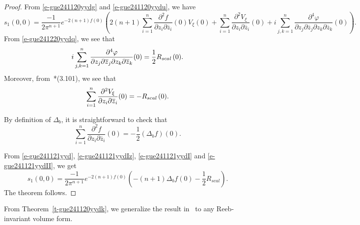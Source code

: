 \documentclass[12pt]{amsart}
\theoremstyle{definition}
\theoremstyle{named}
\numberwithin{equation}{subsection}
\begin{document}
\begin{proof}
    
    From \eqref{e-gue241120yydg} and \eqref{e-gue241120yydu}, we have 
   \begin{equation}\label{e-gue241121yyd}
       s_1(0,0)=\frac{-1}{2\pi^{n+1}}e^{-2(n+1)f(0)}\left(2(n+1)\sum_{i=1}^{n}\frac{\partial^2 f}{\partial z_i\partial\overline{z}_i}(0)V_{\xi}(0)+\sum_{i=1}^{n}\frac{\partial^2 V_\xi}{\partial z_i\partial\overline{z}_i}(0)+i\sum_{j,k=1}^n\frac{\partial^4\varphi}{\partial z_j\partial\overline{z}_j\partial z_k\partial\overline{z}_k}(0)\right).
       \end{equation}
       From \eqref{e-gue241220yydq}, we see that 
       \begin{equation}\label{e-gue241121yydIz}
i\sum_{j,k=1}^n\frac{\partial^4\varphi}{\partial z_j\partial\overline{z}_j\partial z_k\partial\overline{z}_k}(0)=\frac{1}{2}R_{{\rm scal\,}}(0).
       \end{equation}
Moreover, from~\cite{Hsiao_Shen_2nd_coefficient_BS_2020}*{(3.101)}, we see that 
 \begin{equation}\label{e-gue241121yydI}
 \sum_{i=1}^{n}\frac{\partial^2 V_\xi}{\partial z_i\partial\overline{z}_i}(0)=-R_{{\rm scal\,}}(0).
       \end{equation}

By definition of $\Delta_b$, it is straightforward to check that 
 \begin{equation}\label{e-gue241121yydII}
 \sum_{i=1}^{n}\frac{\partial^2 f}{\partial z_i\partial\overline{z}_i}(0)=-\frac{1}{2}(\Delta_bf)(0).
 \end{equation}

From \eqref{e-gue241121yyd}, \eqref{e-gue241121yydIz}, \eqref{e-gue241121yydI} and \eqref{e-gue241121yydII}, we get 
\begin{equation}\label{e-gue241121yydIII}
       s_1(0,0)=\frac{-1}{2\pi^{n+1}}e^{-2(n+1)f(0)}\left(-(n+1)\Delta_b f(0)-\frac{1}{2}R_{scal}\right).
   \end{equation}
   The theorem follows. 
\end{proof}

From Theorem~\ref{t-gue241120yydk}, we generalize the result in~\cite{Hsiao_Shen_2nd_coefficient_BS_2020} to any Reeb-invariant volume form. 
\end{document}
